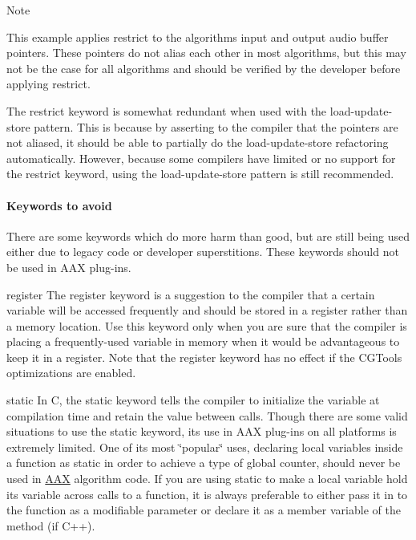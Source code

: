 \begin{DoxyNote}{Note}

\begin{DoxyItemize}
\item This example applies {\ttfamily restrict }to the algorithm\textquotesingle{}s input and output audio buffer pointers. These pointers do not alias each other in most algorithms, but this may not be the case for all algorithms and should be verified by the developer before applying {\ttfamily restrict}. 


\item The {\ttfamily restrict} keyword is somewhat redundant when used with the load-\/update-\/store pattern. This is because by asserting to the compiler that the pointers are not aliased, it should be able to partially do the load-\/update-\/store refactoring automatically. However, because some compilers have limited or no support for the {\ttfamily restrict} keyword, using the load-\/update-\/store pattern is still recommended.  
\end{DoxyItemize}
\end{DoxyNote}
\hypertarget{a00362_subsubsection__keywords_to_avoid_}{}\paragraph{Keywords to avoid}\label{a00362_subsubsection__keywords_to_avoid_}
 There are some keywords which do more harm than good, but are still being used either due to legacy code or developer superstitions. These keywords should not be used in A\+A\+X plug-\/ins.


\begin{DoxyItemize}
\item {\ttfamily register}  The {\ttfamily register} keyword is a suggestion to the compiler that a certain variable will be accessed frequently and should be stored in a register rather than a memory location. Use this keyword only when you are sure that the compiler is placing a frequently-\/used variable in memory when it would be advantageous to keep it in a register. Note that the {\ttfamily register} keyword has no effect if the C\+G\+Tools optimizations are enabled.  


\item {\ttfamily static}  In C, the {\ttfamily static} keyword tells the compiler to initialize the variable at compilation time and retain the value between calls. Though there are some valid situations to use the {\ttfamily static} keyword, its use in A\+A\+X plug-\/ins on all platforms is extremely limited. One of its most \char`\"{}popular\char`\"{} uses, declaring local variables inside a function as {\ttfamily static} in order to achieve a type of global counter, should never be used in \hyperlink{a00288}{A\+A\+X} algorithm code. If you are using {\ttfamily static} to make a local variable hold its variable across calls to a function, it is always preferable to either pass it in to the function as a modifiable parameter or declare it as a member variable of the method (if C++).  


\end{DoxyItemize}

